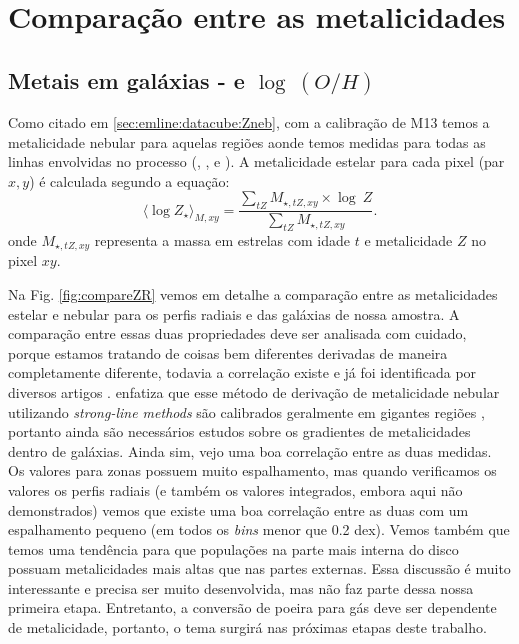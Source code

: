 
\section{Comparação entre as metalicidades}
\label{sec:synvsneb:Z}

\subsection{Metais em galáxias -  e $\log\ (O/H)$}
\label{sec:synvsneb:ZemuZR}

Como citado em \ref{sec:emline:datacube:Zneb}, com a calibração de M13 temos a metalicidade nebular
para aquelas regiões aonde temos medidas para todas as linhas envolvidas no processo (\Hbeta, \oIII,
\Halpha e \nII). A metalicidade estelar para cada pixel (par $x,y$) é calculada segundo a equação:
\begin{equation}
 	\label{eq:logZmass}
 	\langle \log Z_\star \rangle_{M,xy} = 
	\frac{ \sum_{tZ} M_{\star,tZ,xy} \times \log\ Z}{
	\sum_{tZ} M_{\star,tZ,xy} }.
\end{equation}
\noindent onde $M_{\star,tZ,xy}$ representa a massa em estrelas com idade $t$ e metalicidade $Z$ no
pixel $xy$. 

Na Fig. \ref{fig:compareZR} vemos em detalhe a comparação entre as metalicidades estelar e nebular
para os perfis radiais e das galáxias de nossa amostra. A comparação entre essas duas propriedades
deve ser analisada com cuidado, porque estamos tratando de coisas bem diferentes derivadas de
maneira completamente diferente, todavia a correlação existe e já foi identificada por diversos
artigos \citep{CidFernandes.etal.2005a, Gallazzi.etal.2005a, CidFernandes.etal.2007a,
Asari.etal.2007a}. \citet{Stasinska.etal.2006a} enfatiza que esse método de derivação de
metalicidade nebular utilizando {\em strong-line methods} são calibrados geralmente em gigantes
regiões \Hii, portanto ainda são necessários estudos sobre os gradientes de metalicidades dentro de
galáxias. Ainda sim, vejo uma boa correlação entre as duas medidas. Os valores para zonas possuem
muito espalhamento, mas quando verificamos os valores os perfis radiais (e também os valores
integrados, embora aqui não demonstrados) vemos que existe uma boa correlação entre as duas com um
espalhamento pequeno (em todos os {\em bins} menor que 0.2 dex). Vemos também que temos uma
tendência para que populações na parte mais interna do disco possuam metalicidades mais altas que
nas partes externas. Essa discussão é muito interessante e precisa ser muito desenvolvida, mas não
faz parte dessa nossa primeira etapa. Entretanto, a conversão de poeira para gás deve ser dependente
de metalicidade, portanto, o tema surgirá nas próximas etapas deste trabalho.

